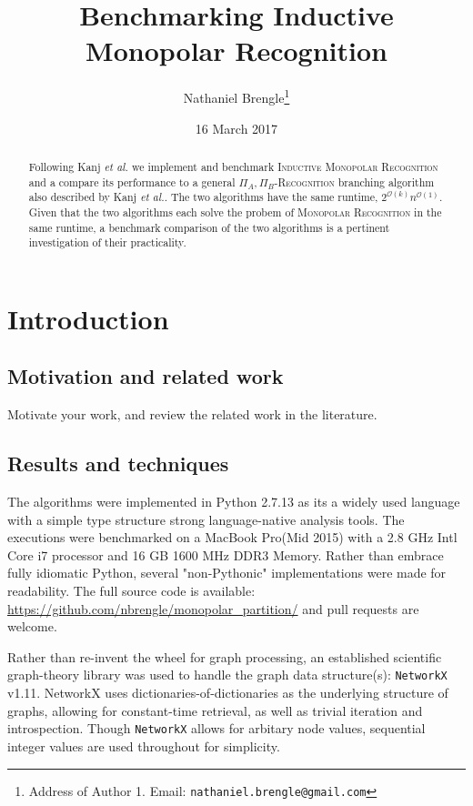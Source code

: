 \documentclass[11pt]{article}
\date{16 March 2017}
\title{Benchmarking Inductive Monopolar Recognition}
\author{{\sc Nathaniel Brengle}\thanks{Address of Author 1. Email: {\tt nathaniel.brengle@gmail.com}}}
\newcommand{\inlinecode}{\texttt}
\newcommand{\Oh}{{\mathcal O}}
\begin{document}
\maketitle

\begin{abstract}
Following Kanj \textit{et al.} \cite{ref1} we implement and benchmark \textsc{Inductive Monopolar Recognition} and a compare its performance to a general \textsc{$\Pi_A,\Pi_B$-Recognition} branching algorithm also described by Kanj \textit{et al.}. The two algorithms have the same runtime, $2^{\Oh(k)}n^{\Oh(1)}$. Given that the two algorithms each solve the probem of \textsc{Monopolar Recognition} in the same runtime, a benchmark comparison of the two algorithms is a pertinent investigation of their practicality.

\end{abstract}



\section{Introduction}
\label{sec:intro}

\subsection{Motivation and related work}
\label{subsec:motive}
Motivate your work, and review the related work in the literature.

\subsection{Results and techniques}
\label{subsec:results}
The algorithms were implemented in Python 2.7.13 as its a widely used language with a simple type structure strong language-native analysis tools. The executions were benchmarked on a MacBook Pro(Mid 2015) with a 2.8 GHz Intl Core i7 processor and 16 GB 1600 MHz DDR3 Memory. Rather than embrace fully idiomatic Python, several "non-Pythonic" implementations were made for readability. The full source code is available: \url{https://github.com/nbrengle/monopolar_partition/} and pull requests are welcome.

Rather than re-invent the wheel for graph processing, an established scientific graph-theory library was used to handle the graph data structure(s): \inlinecode{NetworkX} v1.11. NetworkX uses dictionaries-of-dictionaries as the underlying structure of graphs, allowing for constant-time retrieval, as well as trivial iteration and introspection. Though \inlinecode{NetworkX} allows for arbitary node values, sequential integer values are used throughout for simplicity.
\end{document}
